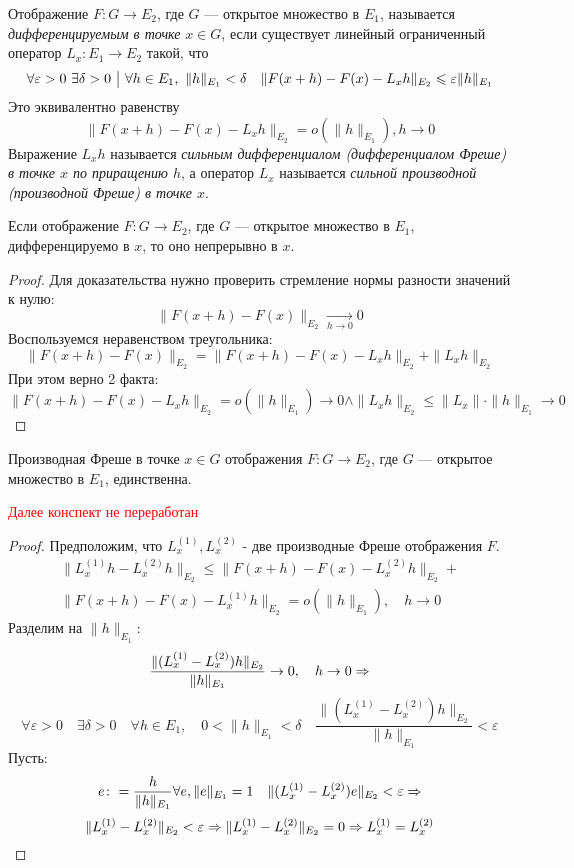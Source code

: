 \begin{definition} 
    Отображение $F \colon G \to E_2$, где $G$ --- открытое множество в $E_1$, называется \textit{дифференцируемым в точке} $x \in G$, если существует линейный ограниченный оператор $L_x \colon E_1 \to E_2$ такой, что 
    \[
        \forall \varepsilon > 0\ \exists \delta > 0 \ \big|\  \forall h \in E_1,\ \|h\|_{E_1} < \delta \quad \|F(x + h) - F(x) - L_xh\|_{E_2} \leqslant \varepsilon \|h\|_{E_1}
    \]
    Это эквивалентно равенству
    \[
        \|F(x+h)-F(x)-L_x h\|_{E_2}=o(\|h\|_{E_1}), h \to 0
    \]
    Выражение $L_xh$ называется \textit{сильным дифференциалом (дифференциалом Фреше) в точке $x$ по приращению $h$}, а оператор $L_x$ называется \textit{сильной производной (производной Фреше) в точке $x$}.
\end{definition}

\begin{proposition}
    Если отображение $F \colon G \to E_2$, где $G$ --- открытое множество в $E_1$, дифференцируемо в $x$, то оно непрерывно в $x$.
\end{proposition}
\begin{proof}
 	Для доказательства нужно проверить стремление нормы разности значений к нулю:
    \[
        \|F(x + h) - F(x)\|_{E_2} \xrightarrow[h \to 0]{} 0
    \]
    Воспользуемся неравенством треугольника:
    \[  
        \|F(x + h) - F(x)\|_{E_2} = \|F(x + h) - F(x) - L_xh\|_{E_2} + \|L_xh\|_{E_2}
    \]
    При этом верно 2 факта:
    \[
        \|F(x + h) - F(x) - L_xh\|_{E_2} = o(\|h\|_{E_1}) \to 0 \wedge \|L_xh\|_{E_2} \leq \|L_x\| \cdot \|h\|_{E_1} \to 0
    \]
\end{proof}

\begin{proposition}
    Производная Фреше в точке $x \in G$ отображения $F \colon G \to E_2$, где $G$ --- открытое множество в $E_1$, единственна.
\end{proposition}

\textcolor{red}{Далее конспект не переработан}

\begin{proof}
    Предположим, что $L^{(1)}_x, L^{(2)}_x$ - две производные Фреше отображения $F$. 
    \begin{multline*}
        \|L^{(1)}_x h - L^{(2)}_x h\|_{E_2} \leq \|F(x+h)-F(x)-L^{(2)}_x h\|_{E_2} +\\
        \|F(x+h)-F(x)-L^{(1)}_x h\|_{E_2} = o(\|h\|_{E_1}),\quad h \to 0
    \end{multline*}
    Разделим на $\|h\|_{E_1} \colon$
    \[
        \frac{\|(L^{(1)}_x- L^{(2)}_x)h\|_{E_2}}{\|h\|_{E_1}} \to 0, \quad h \to 0 \Rightarrow
    \]
    \[
        \forall \varepsilon>0 \quad \exists \delta>0 \quad \forall h \in E_1, \quad 0<\|h\|_{E_1}<\delta \quad \frac{\|(L^{(1)}_x- L^{(2)}_x)h\|_{E_2}}{\|h\|_{E_1}} < \varepsilon
    \]
    Пусть$\colon$
    \[  
        e\colon = \frac{h}{\|h\|_{E_1}}\\
        \forall e, \|e\|_{E_1}=1 \quad \|(L^{(1)}_x- L^{(2)}_x)e\|_{E_2} < \varepsilon \Rightarrow 
    \]
    \[ 
        \|L^{(1)}_x- L^{(2)}_x\|_{E_2} < \varepsilon \Rightarrow \|L^{(1)}_x- L^{(2)}_x\|_{E_2} = 0 \Rightarrow L^{(1)}_x= L^{(2)}_x
    \]
\end{proof}

